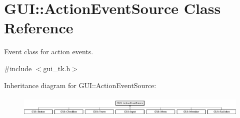 \hypertarget{classGUI_1_1ActionEventSource}{\section{G\-U\-I\-:\-:Action\-Event\-Source Class Reference}
\label{classGUI_1_1ActionEventSource}
}


Event class for action events.  




{\ttfamily \#include $<$gui\-\_\-tk.\-h$>$}

Inheritance diagram for G\-U\-I\-:\-:Action\-Event\-Source\-:\begin{figure}[H]
\begin{center}
\leavevmode
\includegraphics[height=1.032258cm]{classGUI_1_1ActionEventSource}
\end{center}
\end{figure}
